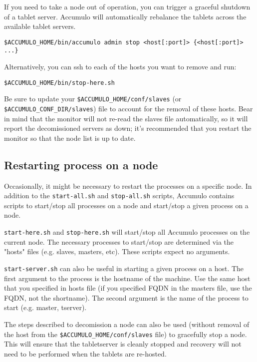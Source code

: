 If you need to take a node out of operation, you can trigger a graceful shutdown of a tablet 
server. Accumulo will automatically rebalance the tablets across the available tablet servers.

\begingroup\fontsize{8pt}{8pt}\selectfont\begin{verbatim}
$ACCUMULO_HOME/bin/accumulo admin stop <host[:port]> {<host[:port]> ...}
\end{verbatim}\endgroup

Alternatively, you can ssh to each of the hosts you want to remove and run:

\begingroup\fontsize{8pt}{8pt}\selectfont\begin{verbatim}
$ACCUMULO_HOME/bin/stop-here.sh
\end{verbatim}\endgroup

Be sure to update your \texttt{\$ACCUMULO\_HOME/conf/slaves} (or \texttt{\$ACCUMULO\_CONF\_DIR/slaves}) file to 
account for the removal of these hosts. Bear in mind that the monitor will not re-read the 
slaves file automatically, so it will report the decomissioned servers as down; it's 
recommended that you restart the monitor so that the node list is up to date.

\subsection{Restarting process on a node}

Occasionally, it might be necessary to restart the processes on a specific node. In addition
to the \texttt{start-all.sh} and \texttt{stop-all.sh} scripts, Accumulo contains scripts to start/stop all processes
on a node and start/stop a given process on a node.

\texttt{start-here.sh} and \texttt{stop-here.sh} will start/stop all Accumulo processes on the current node. The
necessary processes to start/stop are determined via the "hosts" files (e.g. slaves, masters, etc).
These scripts expect no arguments.

\texttt{start-server.sh} can also be useful in starting a given process on a host.
The first argument to the process is the hostname of the machine. Use the same host that 
you specified in hosts file (if you specified FQDN in the masters file, use the FQDN, not
the shortname). The second argument is the name of the process to start (e.g. master, tserver).

The steps described to decomission a node can also be used (without removal of the host
from the \texttt{\$ACCUMULO\_HOME/conf/slaves} file) to gracefully stop a node. This will
ensure that the tabletserver is cleanly stopped and recovery will not need to be performed
when the tablets are re-hosted.

